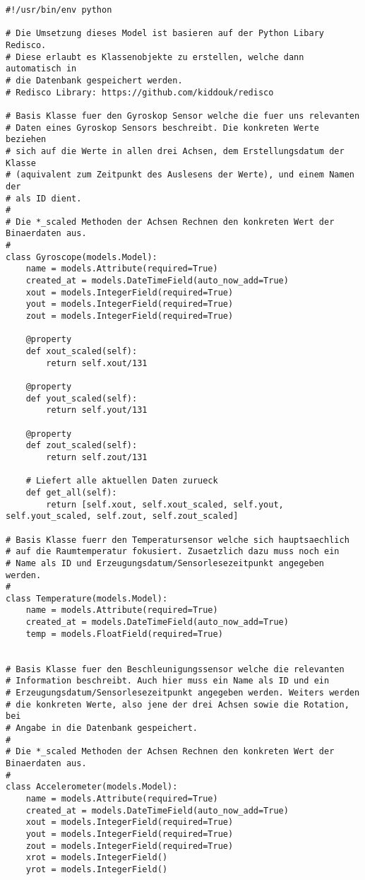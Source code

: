 \begin{lstlisting}[style=pythonstyle, caption=Sensorenmodell, label={lst:sensorsammlung}]
#!/usr/bin/env python

# Die Umsetzung dieses Model ist basieren auf der Python Libary Redisco.
# Diese erlaubt es Klassenobjekte zu erstellen, welche dann automatisch in 
# die Datenbank gespeichert werden.
# Redisco Library: https://github.com/kiddouk/redisco

# Basis Klasse fuer den Gyroskop Sensor welche die fuer uns relevanten 
# Daten eines Gyroskop Sensors beschreibt. Die konkreten Werte beziehen
# sich auf die Werte in allen drei Achsen, dem Erstellungsdatum der Klasse 
# (aquivalent zum Zeitpunkt des Auslesens der Werte), und einem Namen der 
# als ID dient.
# 
# Die *_scaled Methoden der Achsen Rechnen den konkreten Wert der Binaerdaten aus.
# 
class Gyroscope(models.Model):
    name = models.Attribute(required=True)
    created_at = models.DateTimeField(auto_now_add=True)
    xout = models.IntegerField(required=True)
    yout = models.IntegerField(required=True)
    zout = models.IntegerField(required=True)

    @property
    def xout_scaled(self):
        return self.xout/131

    @property
    def yout_scaled(self):
        return self.yout/131

    @property
    def zout_scaled(self):
        return self.zout/131

    # Liefert alle aktuellen Daten zurueck
    def get_all(self):
        return [self.xout, self.xout_scaled, self.yout, self.yout_scaled, self.zout, self.zout_scaled]

# Basis Klasse fuerr den Temperatursensor welche sich hauptsaechlich
# auf die Raumtemperatur fokusiert. Zusaetzlich dazu muss noch ein 
# Name als ID und Erzeugungsdatum/Sensorlesezeitpunkt angegeben werden.
# 
class Temperature(models.Model):
    name = models.Attribute(required=True)
    created_at = models.DateTimeField(auto_now_add=True)
    temp = models.FloatField(required=True)


# Basis Klasse fuer den Beschleunigungssensor welche die relevanten 
# Information beschreibt. Auch hier muss ein Name als ID und ein 
# Erzeugungsdatum/Sensorlesezeitpunkt angegeben werden. Weiters werden
# die konkreten Werte, also jene der drei Achsen sowie die Rotation, bei
# Angabe in die Datenbank gespeichert.
# 
# Die *_scaled Methoden der Achsen Rechnen den konkreten Wert der Binaerdaten aus.
#
class Accelerometer(models.Model):
    name = models.Attribute(required=True)
    created_at = models.DateTimeField(auto_now_add=True)
    xout = models.IntegerField(required=True)
    yout = models.IntegerField(required=True)
    zout = models.IntegerField(required=True)
    xrot = models.IntegerField()
    yrot = models.IntegerField()


\end{lstlisting}
